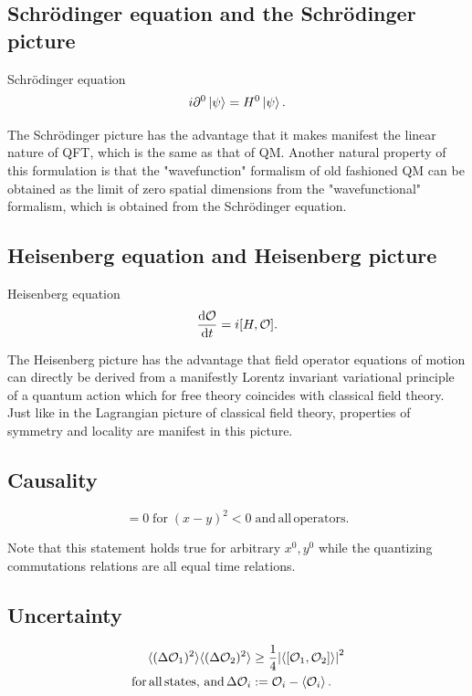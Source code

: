 \subsection{Schrödinger equation and the Schrödinger picture}
\begin{mybox}{Schrödinger equation}
	\begin{equation}
		i \partial^0 \ket{\psi} = H^0 \ket{\psi}.
	\end{equation}
\end{mybox}
The Schrödinger picture has the advantage that it makes manifest the linear nature of QFT, which is the same as that of QM. Another natural property of this formulation is that the "wavefunction" formalism of old fashioned QM can be obtained as the limit of zero spatial dimensions from the "wavefunctional" formalism, which is obtained from the Schrödinger equation.
\subsection{Heisenberg equation and Heisenberg picture}
\begin{mybox}{Heisenberg equation}
	\begin{equation}
	\frac{\mathrm{d} \mathcal{O}}{\mathrm{d} t} = i [H,\mathcal{O}].
	\end{equation}
\end{mybox}
The Heisenberg picture has the advantage that field operator equations of motion can directly be derived from a manifestly Lorentz invariant variational principle of a quantum action which for free theory coincides with classical field theory. Just like in the Lagrangian picture of classical field theory, properties of symmetry and locality are manifest in this picture.
\subsection{Causality}
\begin{mybox}{}
	\begin{equation}
			[\mO_i(x),\mO_j(y)] = 0 \; \mathrm{for}\; (x-y)^2 <0 \mathrm{\; and \, all \,operators}.
	\end{equation}
\end{mybox}
Note that this statement holds true for arbitrary $x^0,y^0$ while the quantizing commutations relations are all equal time relations.
\subsection{Uncertainty}
\begin{mybox}{}
	\begin{align}
		\langle (\Delta \mathcal{O}_1)^2\rangle \langle (\Delta \mathcal{O}_2)^2 \rangle &\geq \frac{1}{4} \abs{\langle [\mathcal{O}_1,\mathcal{O}_2]\rangle}^2\\
		 \mathrm{\,for\,all\,states,\,and\,} \Delta \mathcal{O}_i&:= \mathcal{O}_i -\expval{\mathcal{O}_i}.\nonumber
	\end{align}
\end{mybox}


